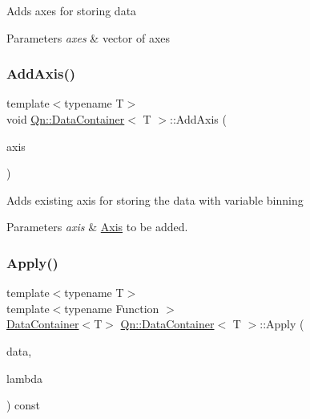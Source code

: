 Adds axes for storing data 
\begin{DoxyParams}{Parameters}
{\em axes} & vector of axes \\
\hline
\end{DoxyParams}
\mbox{\label{classQn_1_1DataContainer_a5fd9996f60f536d991b0b4f6cdd9d838}} 
\subsubsection{\texorpdfstring{Add\+Axis()}{AddAxis()}}
{\footnotesize\ttfamily template$<$typename T$>$ \\
void \mbox{\hyperlink{classQn_1_1DataContainer}{Qn\+::\+Data\+Container}}$<$ T $>$\+::Add\+Axis (\begin{DoxyParamCaption}\item[{const \mbox{\hyperlink{classQn_1_1Axis}{Axis}} \&}]{axis }\end{DoxyParamCaption})\hspace{0.3cm}{\ttfamily [inline]}}

Adds existing axis for storing the data with variable binning 
\begin{DoxyParams}{Parameters}
{\em axis} & \mbox{\hyperlink{classQn_1_1Axis}{Axis}} to be added. \\
\hline
\end{DoxyParams}
\mbox{\label{classQn_1_1DataContainer_afe0598569174690569116e5120234b7d}} 
\subsubsection{\texorpdfstring{Apply()}{Apply()}}
{\footnotesize\ttfamily template$<$typename T$>$ \\
template$<$typename Function $>$ \\
\mbox{\hyperlink{classQn_1_1DataContainer}{Data\+Container}}$<$T$>$ \mbox{\hyperlink{classQn_1_1DataContainer}{Qn\+::\+Data\+Container}}$<$ T $>$\+::Apply (\begin{DoxyParamCaption}\item[{const \mbox{\hyperlink{classQn_1_1DataContainer}{Data\+Container}}$<$ T $>$ \&}]{data,  }\item[{Function \&\&}]{lambda }\end{DoxyParamCaption}) const\hspace{0.3cm}{\ttfamily [inline]}}


